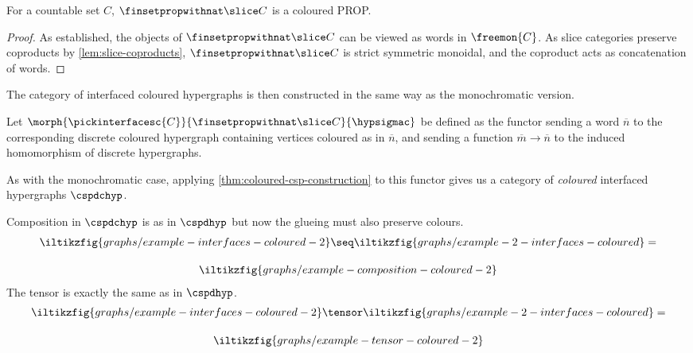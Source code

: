 \begin{proposition}\label{prop:hatfinsetprop-slice-is-coloured-prop}
    For a countable set \(C\), \(\finsetpropwithnat \slice C\) is a
    coloured PROP.
\end{proposition}
\begin{proof}
    As established, the objects of \(\finsetpropwithnat \slice C\) can be viewed
    as words in \(\freemon{C}\).
    As slice categories preserve coproducts by \cref{lem:slice-coproducts},
    \(\finsetpropwithnat \slice C\) is strict symmetric monoidal, and the
    coproduct acts as concatenation of words.
\end{proof}

The category of interfaced coloured hypergraphs is then constructed in the same
way as the monochromatic version.

\begin{definition}
    Let \(\morph{\pickinterfacesc{C}}{\finsetpropwithnat \slice C}{\hypsigmac}\)
    be defined as the functor sending a word \(\overline{n}\) to the
    corresponding discrete coloured hypergraph containing vertices coloured as
    in \(\overline{n}\), and sending a function \(\overline{m} \to \overline{n}\)
    to the induced homomorphism of discrete hypergraphs.
\end{definition}

As with the monochromatic case, applying \cref{thm:coloured-csp-construction} to
this functor gives us a category of \emph{coloured} interfaced hypergraphs
\(\cspdchyp\).

\begin{example}
    Composition in \(\cspdchyp\) is as in \(\cspdhyp\) but now the glueing
    must also preserve colours.
    \begin{gather*}
        \iltikzfig{graphs/example-interfaces-coloured-2}
        \seq
        \iltikzfig{graphs/example-2-interfaces-coloured}
        =\\[1em]
        \iltikzfig{graphs/example-composition-coloured-2}
    \end{gather*}
    The tensor is exactly the same as in \(\cspdhyp\).
    \begin{gather*}
        \iltikzfig{graphs/example-interfaces-coloured-2}
        \tensor
        \iltikzfig{graphs/example-2-interfaces-coloured}
        =\\[1em]
        \iltikzfig{graphs/example-tensor-coloured-2}
    \end{gather*}
\end{example}